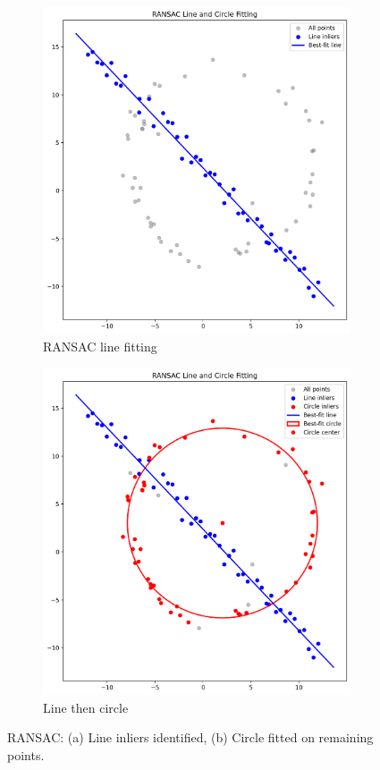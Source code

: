 \documentclass[10pt,a4paper,twocolumn]{article}
\begin{document}
\begin{figure}[H]
\centering
\begin{subfigure}{0.48\columnwidth}
\includegraphics[width=\columnwidth]{fig/Q2_ransac_line.png}
\caption{RANSAC line fitting}
\end{subfigure}\hfill
\begin{subfigure}{0.48\columnwidth}
\includegraphics[width=\columnwidth]{fig/Q2_ransac_line_circle.png}
\caption{Line then circle}
\end{subfigure}
\caption{RANSAC: (a) Line inliers identified, (b) Circle fitted on remaining points.}
\label{fig:q2_results}
\end{figure}
\end{document}
